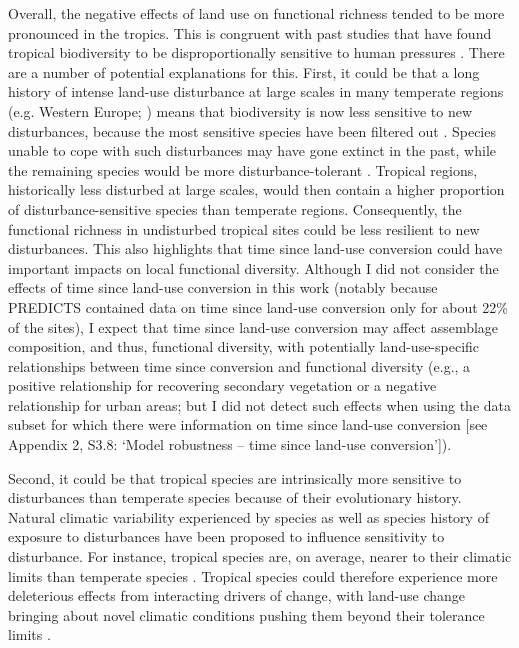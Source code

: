 Overall, the negative effects of land use on functional richness tended to be more pronounced in the tropics. This is congruent with past studies that have found tropical biodiversity to be disproportionally sensitive to human pressures \citep{Newbold2020, Martins2017}. There are a number of potential explanations for this. First, it could be that a long history of intense land-use disturbance at large scales in many temperate regions (e.g. Western Europe; \citet{Stephens2019}) means that biodiversity is now less sensitive to new disturbances, because the most sensitive species have been filtered out \citep{Balmford1996, Krauss2010, LeProvost2020, Munteanu2020}. Species unable to cope with such disturbances may have gone extinct in the past, while the remaining species would be more disturbance-tolerant \citep{Betts2019}. Tropical regions, historically less disturbed at large scales, would then contain a higher proportion of disturbance-sensitive species than temperate regions. Consequently, the functional richness in undisturbed tropical sites could be less resilient to new disturbances. This also highlights that time since land-use conversion could have important impacts on local functional diversity. Although I did not consider the effects of time since land-use conversion in this work (notably because PREDICTS contained data on time since land-use conversion only for about 22\% of the sites), I expect that time since land-use conversion may affect assemblage composition, and thus, functional diversity, with potentially land-use-specific relationships between time since conversion and functional diversity (e.g., a positive relationship for recovering secondary vegetation or a negative relationship for urban areas; but I did not detect such effects when using the data subset for which there were information on time since land-use conversion [see Appendix 2, S3.8: `Model robustness – time since land-use conversion']).

Second, it could be that tropical species are intrinsically more sensitive to disturbances than temperate species because of their evolutionary history. Natural climatic variability experienced by species as well as species history of exposure to disturbances have been proposed to influence sensitivity to disturbance. For instance, tropical species are, on average, nearer to their climatic limits than temperate species \citep{Deutsch2008, Sunday2014a}. Tropical species could therefore experience more deleterious effects from interacting drivers of change, with land-use change bringing about novel climatic conditions pushing them beyond their tolerance limits \citep{Frishkoff2016, Williams2020a}.

